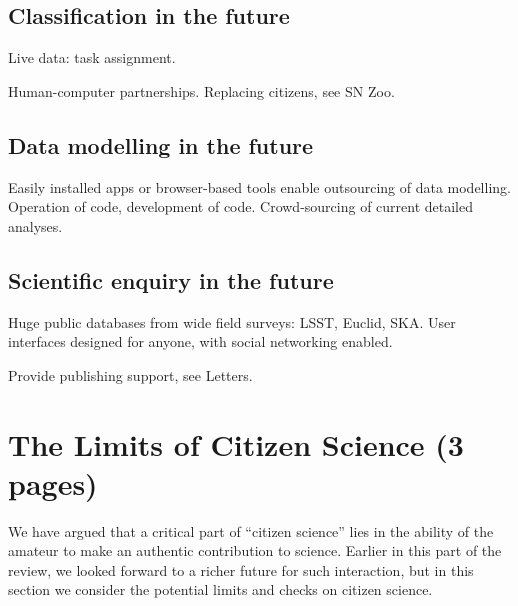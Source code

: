 \documentclass{ar2e}
\begin{document}

\subsection{Classification in the future}
\label{sec:future:class}

Live data: task assignment. 

Human-computer partnerships. Replacing citizens, see SN Zoo.



\subsection{Data modelling in the future}
\label{sec:future:models}

Easily installed apps or browser-based tools enable outsourcing of data
modelling. Operation of code, development of code. Crowd-sourcing of current
detailed analyses.



\subsection{Scientific enquiry in the future}
\label{sec:future:explore}

Huge public databases from wide field surveys: LSST, Euclid, SKA. User
interfaces designed for anyone, with social networking enabled. 

Provide publishing support, see Letters.



\section{The Limits of Citizen Science (3 pages)}
\label{sec:limits}


We have argued that a critical part of ``citizen science'' lies in the ability of
the amateur to make an authentic contribution to science. Earlier in this part
of the review, we looked forward to a richer future for such interaction, but in
this section we consider the potential limits and checks on citizen science. 
\end{document}
